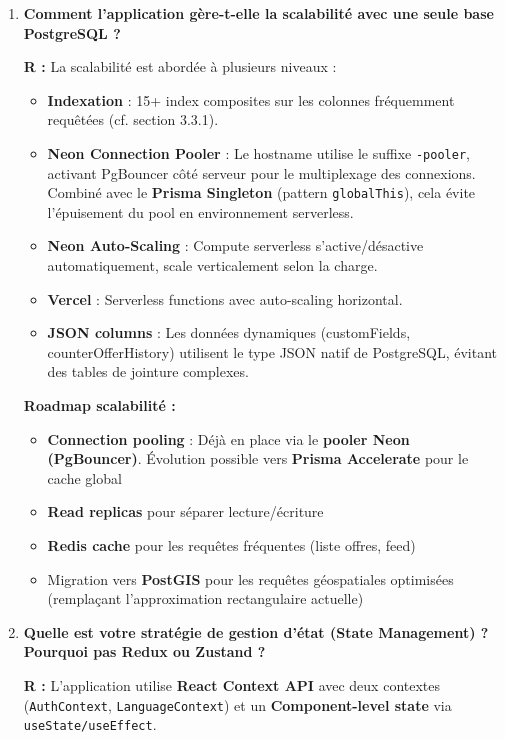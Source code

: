 \documentclass[12pt, a4paper]{article}
\begin{document}
\begin{enumerate}[leftmargin=2em, label=\textbf{Q\arabic*.}]
\vspace{0.5em}

\item \textbf{Comment l'application gère-t-elle la scalabilité avec une seule base PostgreSQL ?}

\textbf{R :} La scalabilité est abordée à plusieurs niveaux :
\begin{itemize}
  \item \textbf{Indexation} : 15+ index composites sur les colonnes fréquemment requêtées (cf. section 3.3.1).
  \item \textbf{Neon Connection Pooler} : Le hostname utilise le suffixe \texttt{-pooler}, activant PgBouncer côté serveur pour le multiplexage des connexions. Combiné avec le \textbf{Prisma Singleton} (pattern \texttt{globalThis}), cela évite l'épuisement du pool en environnement serverless.
  \item \textbf{Neon Auto-Scaling} : Compute serverless s'active/désactive automatiquement, scale verticalement selon la charge.
  \item \textbf{Vercel} : Serverless functions avec auto-scaling horizontal.
  \item \textbf{JSON columns} : Les données dynamiques (customFields, counterOfferHistory) utilisent le type JSON natif de PostgreSQL, évitant des tables de jointure complexes.
\end{itemize}
\textbf{Roadmap scalabilité :}
\begin{itemize}
  \item \textbf{Connection pooling} : Déjà en place via le \textbf{pooler Neon (PgBouncer)}. Évolution possible vers \textbf{Prisma Accelerate} pour le cache global
  \item \textbf{Read replicas} pour séparer lecture/écriture
  \item \textbf{Redis cache} pour les requêtes fréquentes (liste offres, feed)
  \item Migration vers \textbf{PostGIS} pour les requêtes géospatiales optimisées (remplaçant l'approximation rectangulaire actuelle)
\end{itemize}

\vspace{0.5em}

\item \textbf{Quelle est votre stratégie de gestion d'état (State Management) ? Pourquoi pas Redux ou Zustand ?}

\textbf{R :} L'application utilise \textbf{React Context API} avec deux contextes (\texttt{AuthContext}, \texttt{LanguageContext}) et un \textbf{Component-level state} via \texttt{useState/useEffect}.


\end{enumerate}
\end{document}
